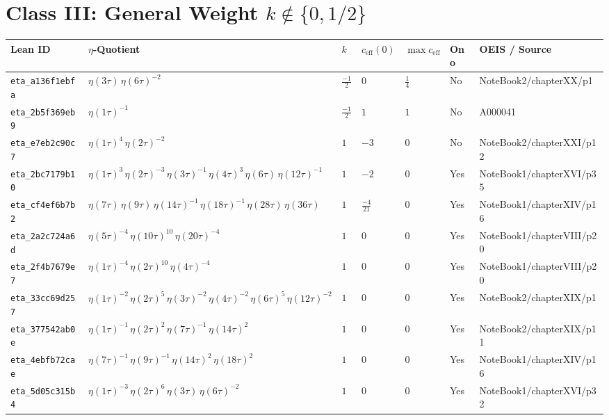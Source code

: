 \documentclass[11pt,twoside,openright]{book}
\begin{document}
\section{Class III: General Weight $k \notin \{0, 1/2\}$}
\begin{longtable}{p{2.3cm}p{4.3cm}llllp{2.3cm}}
\toprule
\textbf{Lean ID} & \textbf{$\eta$-Quotient} & $k$ & $c_{\text{eff}}(0)$ & $\max c_{\text{eff}}$ & \textbf{Ono} & \textbf{OEIS / Source} \\
\midrule
\endhead
\texttt{eta\_a136f1ebfa} & $\eta(3\tau)\, \eta(6\tau)^{-2}$ & $\frac{-1}{2}$ & $0$ & $\frac{1}{4}$ & No & NoteBook2/chapterXX/p1 \\
\texttt{eta\_2b5f369eb9} & $\eta(1\tau)^{-1}$ & $\frac{-1}{2}$ & $1$ & $1$ & No & A000041 \\
\texttt{eta\_e7eb2c90c7} & $\eta(1\tau)^{4}\, \eta(2\tau)^{-2}$ & $1$ & $-3$ & $0$ & No & NoteBook2/chapterXXI/p12 \\
\texttt{eta\_2bc7179b10} & $\eta(1\tau)^{3}\, \eta(2\tau)^{-3}\, \eta(3\tau)^{-1}\, \eta(4\tau)^{3}\, \eta(6\tau)\, \eta(12\tau)^{-1}$ & $1$ & $-2$ & $0$ & Yes & NoteBook1/chapterXVI/p35 \\
\texttt{eta\_cf4ef6b7b2} & $\eta(7\tau)\, \eta(9\tau)\, \eta(14\tau)^{-1}\, \eta(18\tau)^{-1}\, \eta(28\tau)\, \eta(36\tau)$ & $1$ & $\frac{-4}{21}$ & $0$ & Yes & NoteBook1/chapterXIV/p16 \\
\texttt{eta\_2a2c724a6d} & $\eta(5\tau)^{-4}\, \eta(10\tau)^{10}\, \eta(20\tau)^{-4}$ & $1$ & $0$ & $0$ & Yes & NoteBook1/chapterVIII/p20 \\
\texttt{eta\_2f4b7679e7} & $\eta(1\tau)^{-4}\, \eta(2\tau)^{10}\, \eta(4\tau)^{-4}$ & $1$ & $0$ & $0$ & Yes & NoteBook1/chapterVIII/p20 \\
\texttt{eta\_33cc69d257} & $\eta(1\tau)^{-2}\, \eta(2\tau)^{5}\, \eta(3\tau)^{-2}\, \eta(4\tau)^{-2}\, \eta(6\tau)^{5}\, \eta(12\tau)^{-2}$ & $1$ & $0$ & $0$ & Yes & NoteBook2/chapterXIX/p1 \\
\texttt{eta\_377542ab0e} & $\eta(1\tau)^{-1}\, \eta(2\tau)^{2}\, \eta(7\tau)^{-1}\, \eta(14\tau)^{2}$ & $1$ & $0$ & $0$ & Yes & NoteBook2/chapterXIX/p11 \\
\texttt{eta\_4ebfb72cae} & $\eta(7\tau)^{-1}\, \eta(9\tau)^{-1}\, \eta(14\tau)^{2}\, \eta(18\tau)^{2}$ & $1$ & $0$ & $0$ & Yes & NoteBook1/chapterXIV/p16 \\
\texttt{eta\_5d05c315b4} & $\eta(1\tau)^{-3}\, \eta(2\tau)^{6}\, \eta(3\tau)\, \eta(6\tau)^{-2}$ & $1$ & $0$ & $0$ & Yes & NoteBook1/chapterXVI/p32 \\

\end{longtable}
\end{document}
